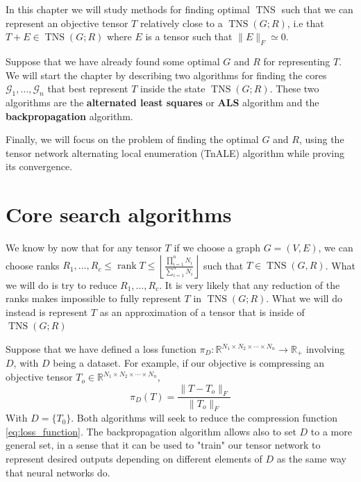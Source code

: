 \documentclass[11pt,a4paper,openright,oneside]{book}
\numberwithin{equation}{section}
\DeclareMathOperator{\rank}{rank}
\DeclareMathOperator{\TNS}{TNS}
\begin{document}
{In this chapter we will study methods for finding optimal $\TNS$ such that we
can represent an objective tensor $T$ relatively close to a $\TNS(G; R)$, i.e that
$T + E \in \TNS(G; R)$ where $E$ is a tensor such that $\|E\|_F \simeq 0$.

Suppose that we have already found some optimal $G$ and $R$ for representing $T$. We will 
start the chapter by describing two algorithms for finding the cores 
$\mathcal{G}_1, \dots, \mathcal{G}_n$ that best represent $T$ inside the state $\TNS(G; R)$. These two algorithms
are the \textbf{alternated least squares} or \textbf{ALS} algorithm and the \textbf{backpropagation} algorithm. 

Finally, we will focus on the problem of finding the optimal $G$ and $R$, using the tensor network alternating local enumeration (TnALE) algorithm while
proving its convergence.




\section{Core search algorithms}

We know by now that for any tensor $T$ if we choose a graph $G = (V, E)$, we can choose ranks 
$R_1, \dots, R_c \leqslant \rank{T} \leqslant \left\lfloor \frac{\prod_{i=1}^n N_i}{\sum_{i=1}^n N_i} \right\rfloor$ such
that $T \in \TNS (G, R)$. What we will do is try to reduce $R_1, \dots, R_c$. It is very likely that any reduction
of the ranks makes impossible to fully represent $T$ in $\TNS(G; R)$. What we will do instead is represent $T$ as an
approximation of a tensor that is inside of $\TNS(G; R)$

Suppose that we have defined a loss function $\pi_D : \mathbb{R}^{N_1 \times N_2 \times \cdots \times N_n} \rightarrow \mathbb{R}_+$
involving $D$, with $D$ being a dataset.
For example, if our objective is compressing an objective tensor $T_o \in \mathbb{R}^{N_1 \times N_2 \times \cdots \times N_n}$,
\begin{equation}
\pi_D(T) = \frac{\| T - T_o \|_F}{\| T_o \|_F}
\label{eq:loss_function}
\end{equation}
With $D = \{T_0\}$. Both algorithms will seek to reduce the compression function \eqref{eq:loss_function}. The backpropagation algorithm
allows also to set $D$ to a more general set, in a sense that it can be used to "train" our tensor network to represent desired outputs
depending on different elements of $D$ as the same way that neural networks do.
}
\end{document}
